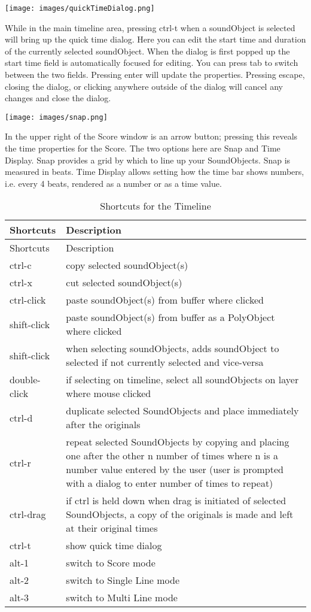 \texttt{[image: images/quickTimeDialog.png]}

While in the main timeline area, pressing ctrl-t when a soundObject is
selected will bring up the quick time dialog. Here you can edit the
start time and duration of the currently selected soundObject. When the
dialog is first popped up the start time field is automatically focused
for editing. You can press tab to switch between the two fields.
Pressing enter will update the properties. Pressing escape, closing the
dialog, or clicking anywhere outside of the dialog will cancel any
changes and close the dialog.

\texttt{[image: images/snap.png]}

In the upper right of the Score window is an arrow button; pressing this
reveals the time properties for the Score. The two options here are Snap
and Time Display. Snap provides a grid by which to line up your
SoundObjects. Snap is measured in beats. Time Display allows setting how
the time bar shows numbers, i.e. every 4 beats, rendered as a number or
as a time value.

\begin{longtable}[]{@{}ll@{}}
\caption{Shortcuts for the Timeline}\tabularnewline
\toprule
Shortcuts & Description\tabularnewline
\midrule
\endfirsthead
\toprule
Shortcuts & Description\tabularnewline
\midrule
\endhead
ctrl-c & copy selected soundObject(s)\tabularnewline
ctrl-x & cut selected soundObject(s)\tabularnewline
ctrl-click & paste soundObject(s) from buffer where
clicked\tabularnewline
shift-click & paste soundObject(s) from buffer as a PolyObject where
clicked\tabularnewline
shift-click & when selecting soundObjects, adds soundObject to selected
if not currently selected and vice-versa\tabularnewline
double-click & if selecting on timeline, select all soundObjects on
layer where mouse clicked\tabularnewline
ctrl-d & duplicate selected SoundObjects and place immediately after the
originals\tabularnewline
ctrl-r & repeat selected SoundObjects by copying and placing one after
the other n number of times where n is a number value entered by the
user (user is prompted with a dialog to enter number of times to
repeat)\tabularnewline
ctrl-drag & if ctrl is held down when drag is initiated of selected
SoundObjects, a copy of the originals is made and left at their original
times\tabularnewline
ctrl-t & show quick time dialog\tabularnewline
alt-1 & switch to Score mode\tabularnewline
alt-2 & switch to Single Line mode\tabularnewline
alt-3 & switch to Multi Line mode\tabularnewline
\bottomrule
\end{longtable}
